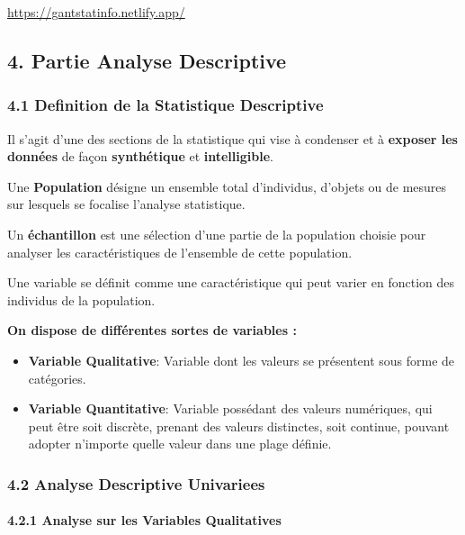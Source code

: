 \documentclass[
]{article}
\begin{document}
\url{https://gantstatinfo.netlify.app/}

\subsection{4. Partie Analyse
Descriptive}\label{partie-analyse-descriptive}

\subsubsection{4.1 Definition de la Statistique
Descriptive}\label{definition-de-la-statistique-descriptive}

Il s'agit d'une des sections de la statistique qui vise à condenser et à
\textbf{exposer les données} de façon \textbf{synthétique} et
\textbf{intelligible}.

Une \textbf{Population} désigne un ensemble total d'individus, d'objets
ou de mesures sur lesquels se focalise l'analyse statistique.

Un \textbf{échantillon} est une sélection d'une partie de la population
choisie pour analyser les caractéristiques de l'ensemble de cette
population.

Une variable se définit comme une caractéristique qui peut varier en
fonction des individus de la population.

\textbf{On dispose de différentes sortes de variables : }

\begin{itemize}
\item
  \textbf{Variable Qualitative}: Variable dont les valeurs se présentent
  sous forme de catégories.
\item
  \textbf{Variable Quantitative}: Variable possédant des valeurs
  numériques, qui peut être soit discrète, prenant des valeurs
  distinctes, soit continue, pouvant adopter n'importe quelle valeur
  dans une plage définie.
\end{itemize}

\subsubsection{4.2 Analyse Descriptive
Univariees}\label{analyse-descriptive-univariees}

\paragraph{4.2.1 Analyse sur les Variables
Qualitatives}\label{analyse-sur-les-variables-qualitatives}
\end{document}
